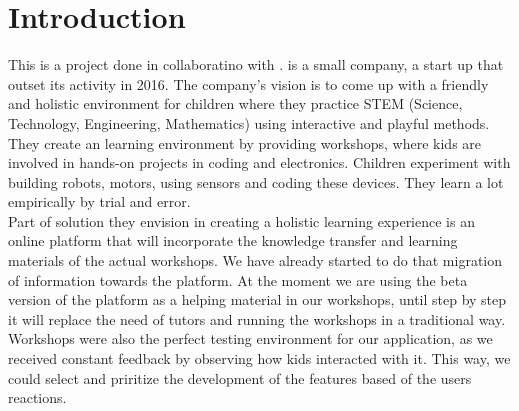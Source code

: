 
\chapter{Introduction}
This is a project done in collaboratino with \sfun. 
\sfun is a small company, a start up that outset its activity in 2016. The company's vision is to 
come up with a friendly and holistic environment for children where they practice STEM (Science, Technology, Engineering, Mathematics) using interactive and playful methods. \\

They create an learning environment by providing workshops, where kids are involved in hands-on projects in coding and electronics. Children experiment with building robots, motors, using sensors and coding these devices. They learn a lot empirically by trial and error.  \\

Part of solution they envision in creating a holistic learning experience is an online platform that will incorporate the knowledge transfer and learning materials of the actual workshops. We have already started to do that migration of information towards the platform. At the moment we are using the beta version of the platform as a helping material in our workshops, until step by step it will replace the need of tutors and running the workshops in a traditional way. \\

Workshops were also the perfect testing environment for our application, as we received constant feedback by observing how kids interacted with it. This way, we could select and priritize the development of the features based of the users reactions.



